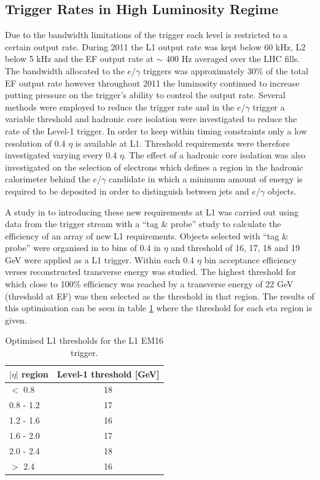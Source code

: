 
	\subsection{Trigger Rates in High Luminosity Regime}
		\label{sec:TrigRates}

		Due to the bandwidth limitations of the trigger each level is restricted to a certain output rate. During 2011 the L1 output rate was kept below 60 kHz, L2 below 5 kHz and the EF output rate at $\sim$ 400 Hz averaged over the LHC fills. The bandwidth allocated to the $e/\gamma$ triggers was approximately 30\% of the total EF output rate however throughout 2011 the luminosity continued to increase putting pressure on the trigger's ability to control the output rate. Several methods were employed to reduce the trigger rate and in the $e/\gamma$ trigger a variable threshold and hadronic core isolation were investigated to reduce the rate of the Level-1 trigger. In order to keep within timing constraints only a low resolution of 0.4 $\eta$ is available at L1. Threshold requirements were therefore investigated varying every 0.4 $\eta$. The effect of a hadronic core isolation was also investigated on the selection of electrons which defines a region in the hadronic calorimeter behind the $e/\gamma$ candidate in which a minimum amount of energy is required to be deposited in order to distinguish between jets and $e/\gamma$ objects. 


		A study in to introducing these new requirements \cite{ATLAS-CONF-2012-048} at L1 was carried out using data from the trigger stream with a ``tag \& probe'' study to calculate the efficiency of an array of new L1 requirements. Objects selected with ``tag \& probe'' were organised in to bins of 0.4 in $\eta$ and threshold of 16, 17, 18 and 19 GeV were applied as a L1 trigger. Within each 0.4 $\eta$ bin acceptance efficiency verses reconstructed transverse energy was studied. The highest threshold for which close to 100\% efficiency was reached by a transverse energy of 22 GeV (threshold at EF) was then selected as the threshold in that region. The results of this optimisation can be seen in table \ref{tab:L1_thresh} where the threshold for each eta region is given. 

		\begin {table}[h!]
		\begin{center}
	  	\begin{tabular}{  l | c  }%
			\hline
			$|\eta|$ region & Level-1 threshold [GeV] \\
			\hline
			$<$ 0.8 	& 18 \\
			0.8 - 1.2 	& 17 \\
			1.2 - 1.6 	& 16 \\
			1.6 - 2.0 	& 17 \\
			2.0 - 2.4 	& 18 \\
			$>$ 2.4 	& 16 \\
	    	\hline
	  	\end{tabular}
	  	\caption{Optimised L1 thresholds for the L1 EM16 trigger.}
	  	\label{tab:L1_thresh}
	  	\end{center}
		\end {table}


